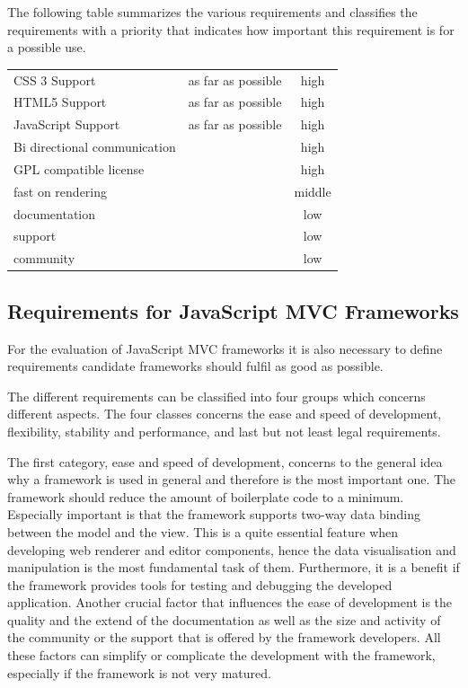 The following table summarizes the various requirements and classifies the requirements with a priority that indicates how important this requirement is for a possible use.

\begin{minipage}{\linewidth}
\centering
 \label{tab:req_browser_comp}
\begin{tabulary}{\textwidth}{|l|C|c|}
 \hline 
{}
   &  &  \tabularnewline
 \hline
CSS 3 Support & as far as possible & high \\
HTML5 Support & as far as possible & high  \\
JavaScript Support & as far as possible & high \\
 Bi directional communication & & high \\
GPL compatible license & & high \\ \hline
fast on rendering & & middle\\
documentation & & low\\
support & & low \\
community & &low \\
 \hline 
 \end{tabulary}
 \end{minipage}

\subsection{Requirements for JavaScript MVC Frameworks}

For the evaluation of JavaScript MVC frameworks it is also necessary to define requirements candidate frameworks should fulfil as good as possible.

The different requirements can be classified into four groups which concerns different aspects.
The four classes concerns the ease and speed of development, flexibility, stability and performance, and last but not least legal requirements.

The first category, ease and speed of development, concerns to the general idea why a framework is used in general and therefore is the most important one.
The framework should reduce the amount of boilerplate code to a minimum.
Especially important is that the framework supports two-way data binding between the model and the view.
This is a quite essential feature when developing web renderer and editor components, hence the data visualisation and manipulation is the most fundamental task of them.
Furthermore, it is a benefit if the framework provides tools for testing and debugging the developed application.
Another crucial factor that influences the ease of development is the quality and the  extend of the documentation as well as the size and activity of the community or the support that is offered by the framework developers.
All these factors can simplify or complicate the development with the framework, especially if the framework is not very matured.

